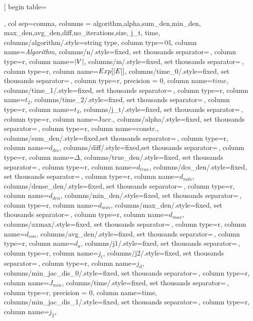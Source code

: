 \begin{table}[t!]
\label{tab:stats-syn}
\pgfplotstabletypeset[
    begin table={\begin{tabular*}{\textwidth}},
    end table={\end{tabular*}},
    col sep=comma,
	columns = {algorithm,alpha,sum_den,min_den, max_den,avg_den,diff,no_iterations,size, j_t, time},
    columns/algorithm/.style={string type, column type={@{\extracolsep{\fill}}l}, column name=\emph{Algorithm}},
    columns/n/.style={fixed, set thousands separator={\,}, column type=r, column name=${\left|V\right|}$},
    columns/m/.style={fixed, set thousands separator={\,}, column type=r, column name=$Exp[{\left|E\right|}]$},
    columns/time_0/.style={fixed, set thousands separator={\,}, column type=r, precision = 0, column name=$time$},
    columns/time_1/.style={fixed, set thousands separator={\,}, column type=r, column name=$t_2$},
    columns/time_2/.style={fixed, set thousands separator={\,}, column type=r, column name=$t_3$},
    columns/j_t/.style={fixed, set thousands separator={\,}, column type=r, column name=Jacc.},
    columns/alpha/.style={fixed, set thousands separator={\,}, column type=r, column name=constr.},
    columns/sum_den/.style={fixed,set thousands separator={\,}, column type=r, column name=$d_{dis}$},
    columns/diff/.style={fixed,set thousands separator={\,}, column type=r, column name=$\Delta$},
    columns/true_den/.style={fixed, set thousands separator={\,}, column type=r, column name=$d_{true}$}, 
    columns/dcs_den/.style={fixed, set thousands separator={\,}, column type=r, column name=$d_{\mathit{mds}}$}, 
    columns/dense_den/.style={fixed, set thousands separator={\,}, column type=r, column name=$d_{den}$}, 
    columns/min_den/.style={fixed, set thousands separator={\,}, column type=r, column name=$d_{\mathit{min}}$}, 
    columns/max_den/.style={fixed, set thousands separator={\,}, column type=r, column name=$d_{\mathit{max}}$}, 
    columns/axmax/.style={fixed, set thousands separator={\,}, column type=r, column name=$d_{\mathit{con}}$}, 
    columns/avg_den/.style={fixed, set thousands separator={\,}, column type=r, column name=$d_{a}$}, 
    columns/j1/.style={fixed, set thousands separator={\,}, column type=r, column name=$j_t$}, 
    columns/j2/.style={fixed, set thousands separator={\,}, column type=r, column name=$j_d$}, 
    columns/min_jac_dis_0/.style={fixed, set thousands separator={\,}, column type=r, column name=$J_{min}$}, 
    columns/time/.style={fixed, set thousands separator={\,}, column type=r, precision = 0, column name=time},
    columns/min_jac_dis_1/.style={fixed, set thousands separator={\,}, column type=r, column name=$j_{2}$}, 

\end{table}
